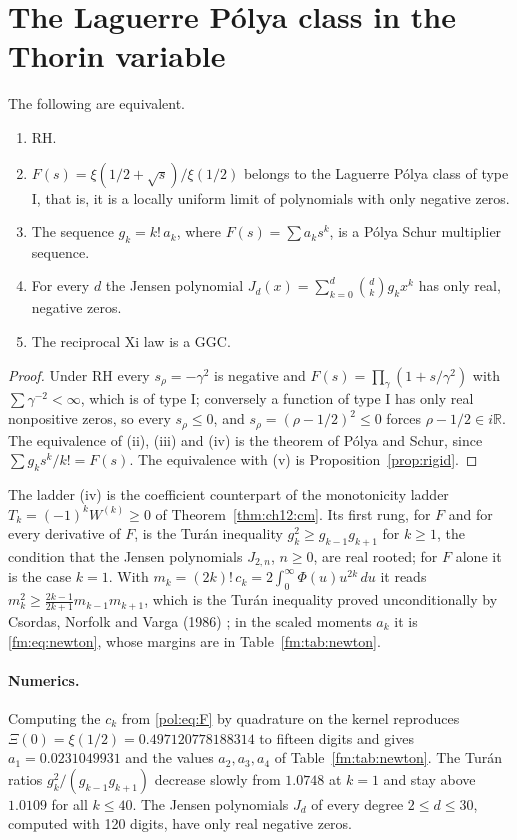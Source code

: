 \section{The Laguerre P\'olya class in the Thorin variable}\label{pol:sec:lp}

\begin{proposition}\label{pol:prop:lp}
The following are equivalent.
\begin{enumerate}
\item[(i)] RH.
\item[(ii)] $F(s)=\xi(1/2+\sqrt s)/\xi(1/2)$ belongs to the Laguerre P\'olya class of type I, that is, it is a locally uniform limit of polynomials with only negative zeros.
\item[(iii)] The sequence $g_k=k!\,a_k$, where $F(s)=\sum a_ks^k$, is a P\'olya Schur multiplier sequence.
\item[(iv)] For every $d$ the Jensen polynomial $J_d(x)=\sum_{k=0}^d\binom dkg_kx^k$ has only real, negative zeros.
\item[(v)] The reciprocal Xi law is a GGC.
\end{enumerate}
\end{proposition}

\begin{proof}
Under RH every $s_\rho=-\gamma^2$ is negative and $F(s)=\prod_\gamma(1+s/\gamma^2)$ with $\sum\gamma^{-2}<\infty$, which is of type I; conversely a function of type I has only real nonpositive zeros, so every $s_\rho\le0$, and $s_\rho=(\rho-1/2)^2\le0$ forces $\rho-1/2\in i\mathbb R$. The equivalence of (ii), (iii) and (iv) is the theorem of P\'olya and Schur, since $\sum g_ks^k/k!=F(s)$. The equivalence with (v) is Proposition~\ref{prop:rigid}.
\end{proof}

The ladder (iv) is the coefficient counterpart of the monotonicity ladder $T_k=(-1)^kW^{(k)}\ge0$ of Theorem~\ref{thm:ch12:cm}. Its first rung, for $F$ and for every derivative of $F$, is the Tur\'an inequality $g_k^2\ge g_{k-1}g_{k+1}$ for $k\ge1$, the condition that the Jensen polynomials $J_{2,n}$, $n\ge0$, are real rooted; for $F$ alone it is the case $k=1$. With $m_k=(2k)!\,c_k=2\int_0^\infty\Phi(u)u^{2k}\,du$ it reads $m_k^2\ge\frac{2k-1}{2k+1}m_{k-1}m_{k+1}$, which is the Tur\'an inequality proved unconditionally by Csordas, Norfolk and Varga (1986) \cite{CNV86}; in the scaled moments $a_k$ it is \eqref{fm:eq:newton}, whose margins are in Table~\ref{fm:tab:newton}.

\paragraph{Numerics.} Computing the $c_k$ from \eqref{pol:eq:F} by quadrature on the kernel reproduces $\Xi(0)=\xi(1/2)=0.497120778188314$ to fifteen digits and gives $a_1=0.0231049931$ and the values $a_2,a_3,a_4$ of Table~\ref{fm:tab:newton}. The Tur\'an ratios $g_k^2/(g_{k-1}g_{k+1})$ decrease slowly from $1.0748$ at $k=1$ and stay above $1.0109$ for all $k\le40$. The Jensen polynomials $J_d$ of every degree $2\le d\le30$, computed with 120 digits, have only real negative zeros.

